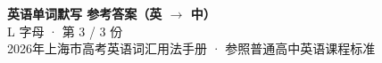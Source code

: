 \documentclass[10pt,a4paper]{article}
\begin{document}
\pagestyle{plain}

\begin{center}
{\LARGE\bfseries 英语单词默写 \quad 参考答案（英 $\to$ 中）}\\[0.22em]
{\large L 字母 · 第 3 / 3 份}\\[0.18em]
{\small 2026年上海市高考英语词汇用法手册 · 参照普通高中英语课程标准}
\end{center}

\vspace{0.2em}
\noindent{\color{rulegray}\rule{\textwidth}{0.8pt}}

\vspace{0.35em}

\vspace{0.25em}
\renewcommand{\arraystretch}{1.32}
\end{document}
